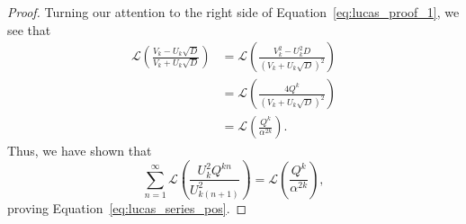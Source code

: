\documentclass[10pt,a4paper]{amsart}
\begin{document}
\begin{proof}
    Turning our attention to the right side of Equation~\eqref{eq:lucas_proof_1}, we see that 
    \begin{align*}
        \mathcal{L}\left(\frac{V_k-U_k \sqrt{D}}{V_k+U_k\sqrt{D}}\right) &= \mathcal{L}\left(\frac{V^2_k-U^2_k D}{(V_k+U_k\sqrt{D})^2}\right) \\
        &= \mathcal{L}\left(\frac{4Q^k}{(V_k+U_k\sqrt{D})^2}\right) \\
        &= \mathcal{L}\left(\frac{Q^k}{\alpha^{2k}}\right).
    \end{align*}
    Thus, we have shown that
    \begin{equation*}
        \sum_{n=1}^{\infty}\mathcal{L}\left(\frac{U^2_k Q^{kn}}{U^2_{k(n+1)}}\right)  = \mathcal{L}\left(\frac{Q^k}{\alpha^{2k}}\right),
    \end{equation*}
   proving Equation~\eqref{eq:lucas_series_pos}.
   

\end{proof}
\end{document}
